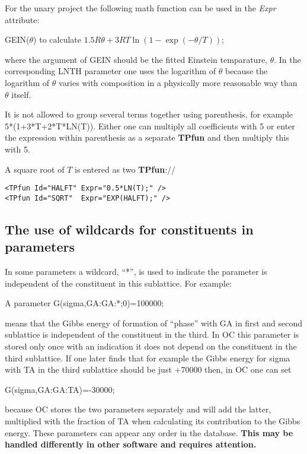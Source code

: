 \documentclass{article}
\begin{document}
For the unary project the following math function can be used in the
{\em Expr} attribute:

GEIN($\theta$) to calculate $1.5R\theta+3RT\ln(1-\exp(-\theta/T));$

\noindent
where the argument of GEIN should be the fitted Einstein temparature,
$\theta$.  In the corresponding LNTH parameter one uses the logarithm
of $\theta$ because the logarithm of $\theta$ varies with composition
in a physically more reasonable way than $\theta$ itself.

It is not allowed to group several terms together using parenthesis,
for example 5*(1+3*T+2*T*LN(T)).  Either one can multiply all
coefficients with 5 or enter the expression within parenthesis as a
separate {\bf TPfun} and then multiply this with 5.

A square root of $T$ is entered as two {\bf TPfun}://
\begin{verbatim}
<TPfun Id="HALFT" Expr="0.5*LN(T);" />
<TPfun Id="SQRT"  Expr="EXP(HALFT);" />
\end{verbatim}

\newpage 

\subsection{The use of wildcards for constituents in parameters}\label{sec:wildcard}

In some parameters a wildcard, ``*'', is used to indicate the
parameter is independent of the constituent in this sublattice.  For
example:

A parameter G(sigma,GA:GA:*;0)=100000;

means that the Gibbs energy of formation of ``phase'' with GA in first
and second sublattice is independent of the constituent in the third.
In OC this parameter is stored only once with an indication it does
not depend on the constituent in the third sublattice.  If one later
finds that for example the Gibbs energy for sigma with TA in the third
sublattice should be just +70000 then, in OC one can set

G(sigma,GA:GA:TA)=-30000;

\noindent
because OC stores the two parameters separately and will add the
latter, multiplied with the fraction of TA when calculating its
contribution to the Gibbs energy.  These parameters can appear any
order in the database.  {\bf This may be handled differently in other
  software and requires attention.}
\end{document}
